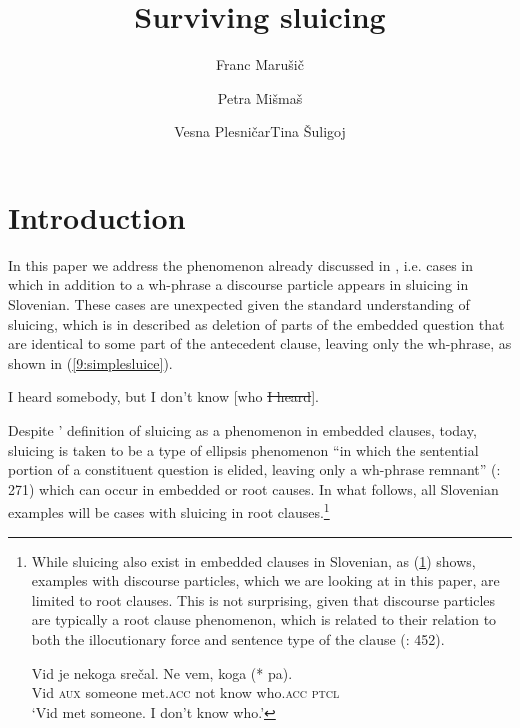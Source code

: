 \documentclass[output=paper,modfonts,newtxmath,hidelinks]{langscibook}
\title{Surviving sluicing}
\author{Franc Marušič\affiliation{University of Nova Gorica}\and Petra Mišmaš\affiliation{University of Nova Gorica}\and Vesna Plesničar\affiliation{University of Nova Gorica}\lastand Tina Šuligoj\affiliation{University of Nova Gorica}}
\begin{document}
\maketitle
{}

\section{Introduction}\label{9:s1}
In this paper we address the phenomenon already discussed in \cite{marusicetal2015}, i.e. cases in which in addition to a wh-phrase a discourse particle appears in sluicing in Slovenian. These cases are unexpected given the standard understanding of sluicing, which is in \cite{ross1969} described as deletion of parts of the embedded question that are identical to some part of the antecedent clause, leaving only the wh-phrase, as shown in (\ref{9:simplesluice}). 


\ea \label{9:simplesluice}I heard somebody, but I don't know [who \sout{I heard}].
\z
 
\noindent Despite \citeauthor{ross1969}' definition of sluicing as a phenomenon in embedded clauses, today, sluicing is taken to be a type of ellipsis phenomenon ``in which the sentential portion of a constituent question is elided, leaving only a wh-phrase remnant'' (\citealt{merchant2006}: 271) which can occur in embedded or root causes. In what follows, all Slovenian examples will be cases with sluicing in root clauses.\footnote{While sluicing also exist in embedded clauses in Slovenian, as (\ref{9:embeddedpa}) shows, examples with discourse particles, which we are looking at in this paper, are limited to root clauses. This is not surprising, given that discourse particles are typically a root clause phenomenon, which is related to their relation to both the illocutionary force and sentence type of the clause (\citealt{bayerobenauer2011}: 452).

\ea \label{9:embeddedpa}
\gll Vid je nekoga srečal. Ne vem, koga (*\hspace{-2pt} pa).\\
Vid \textsc{aux}  someone met.\textsc{acc}  not know who.\textsc{acc} {} \textsc{ptcl}\\
\glt `Vid met someone. I don't know who.'
\zlast }
\end{document}
